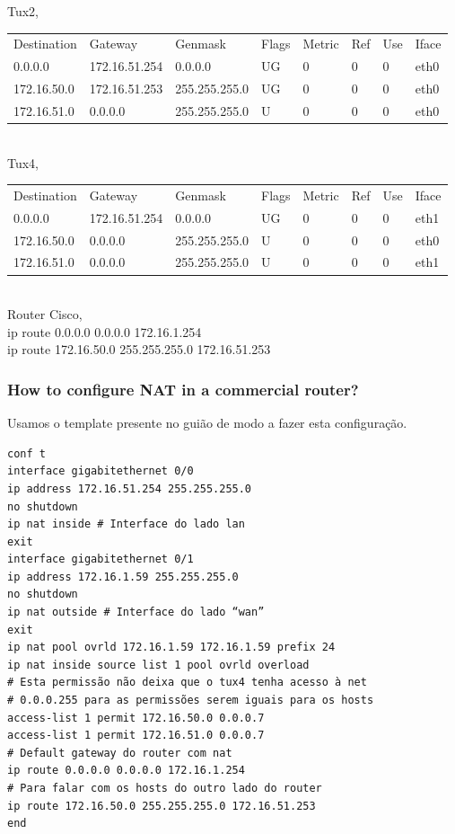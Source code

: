 \documentclass[a4paper]{article}
\begin{document}
\noindent Tux2,\\
\begin{tabular}{l l l l l l l l}
Destination & Gateway & Genmask & Flags & Metric & Ref & Use & Iface \\
0.0.0.0 & 172.16.51.254 & 0.0.0.0 & UG & 0 & 0 & 0 & eth0 \\
172.16.50.0 & 172.16.51.253 & 255.255.255.0 & UG & 0 & 0 & 0 & eth0 \\
172.16.51.0 & 0.0.0.0 & 255.255.255.0 & U & 0 & 0 & 0 & eth0
\end{tabular}\\

\noindent Tux4,\\
\begin{tabular}{l l l l l l l l}
Destination & Gateway & Genmask & Flags & Metric & Ref & Use & Iface \\
0.0.0.0 & 172.16.51.254 & 0.0.0.0 & UG & 0 & 0 & 0 & eth1 \\
172.16.50.0 & 0.0.0.0 & 255.255.255.0 & U & 0 & 0 & 0 & eth0 \\
172.16.51.0 & 0.0.0.0 & 255.255.255.0 & U & 0 & 0 & 0 & eth1
\end{tabular}\\

\noindent Router Cisco,\\
ip route 0.0.0.0 0.0.0.0 172.16.1.254\\
ip route 172.16.50.0 255.255.255.0 172.16.51.253

\subsubsection{How to configure NAT in a commercial router?}
Usamos o template presente no guião de modo a fazer esta configuração.

\begin{verbatim}
conf t
interface gigabitethernet 0/0
ip address 172.16.51.254 255.255.255.0
no shutdown
ip nat inside # Interface do lado lan
exit
interface gigabitethernet 0/1
ip address 172.16.1.59 255.255.255.0
no shutdown
ip nat outside # Interface do lado “wan”
exit
ip nat pool ovrld 172.16.1.59 172.16.1.59 prefix 24
ip nat inside source list 1 pool ovrld overload
# Esta permissão não deixa que o tux4 tenha acesso à net
# 0.0.0.255 para as permissões serem iguais para os hosts
access-list 1 permit 172.16.50.0 0.0.0.7
access-list 1 permit 172.16.51.0 0.0.0.7
# Default gateway do router com nat
ip route 0.0.0.0 0.0.0.0 172.16.1.254
# Para falar com os hosts do outro lado do router
ip route 172.16.50.0 255.255.255.0 172.16.51.253
end
\end{verbatim}
\end{document}
